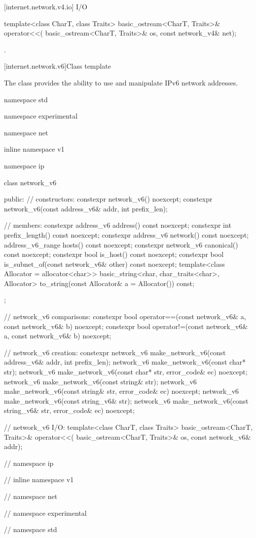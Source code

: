 [internet.network.v4.io]{ I/O}

\begin{itemdecl}
template<class CharT, class Traits>
  basic_ostream<CharT, Traits>& operator<<(
    basic_ostream<CharT, Traits>& os, const network_v4& net);
\end{itemdecl}

\begin{itemdescr}
\pnum
\returns {}.
\end{itemdescr}




%
[internet.network.v6]{Class template }

\pnum
The class  provides the ability to use and manipulate IPv6 network addresses.

\begin{codeblock}
namespace std {
namespace experimental {
namespace net {
inline namespace v1 {
namespace ip {

  class network_v6
  {
  public:
    // constructors:
    constexpr network_v6() noexcept;
    constexpr network_v6(const address_v6& addr, int prefix_len);

    // members:
    constexpr address_v6 address() const noexcept;
    constexpr int prefix_length() const noexcept;
    constexpr address_v6 network() const noexcept;
    address_v6_range hosts() const noexcept;
    constexpr network_v6 canonical() const noexcept;
    constexpr bool is_host() const noexcept;
    constexpr bool is_subnet_of(const network_v6& other) const noexcept;
    template<class Allocator = allocator<char>>
      basic_string<char, char_traits<char>, Allocator>
        to_string(const Allocator& a = Allocator()) const;
  };

  // network_v6 comparisons:
  constexpr bool operator==(const network_v6& a, const network_v6& b) noexcept;
  constexpr bool operator!=(const network_v6& a, const network_v6& b) noexcept;

  // network_v6 creation:
  constexpr network_v6 make_network_v6(const address_v6& addr, int prefix_len);
  network_v6 make_network_v6(const char* str);
  network_v6 make_network_v6(const char* str, error_code& ec) noexcept;
  network_v6 make_network_v6(const string& str);
  network_v6 make_network_v6(const string& str, error_code& ec) noexcept;
  network_v6 make_network_v6(const string_v6& str);
  network_v6 make_network_v6(const string_v6& str, error_code& ec) noexcept;

  // network_v6 I/O:
  template<class CharT, class Traits>
    basic_ostream<CharT, Traits>& operator<<(
      basic_ostream<CharT, Traits>& os, const network_v6& addr);

} // namespace ip
} // inline namespace v1
} // namespace net
} // namespace experimental
} // namespace std
\end{codeblock}

